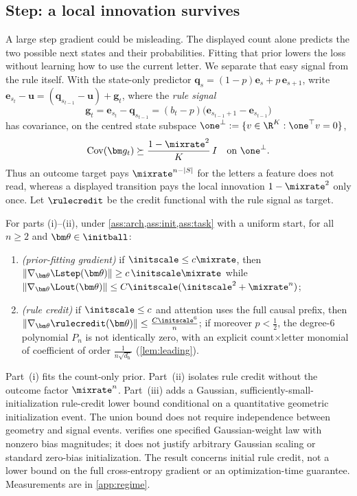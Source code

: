 \subsection{Step: a local innovation survives}
A large step gradient could be misleading. The displayed count alone predicts the two possible next states and their probabilities.
Fitting that prior lowers the loss without learning how to use the current letter. We separate that easy signal from the rule itself. With the
state-only predictor $\bm q_s=(1-p)\bm e_s+p\,\bm e_{s+1}$, write $\bm e_{s_t}-\bm u=(\bm q_{s_{t-1}}-\bm u)+\bm g_t$, where the
\emph{rule signal}
\[
 \bm g_t=\bm e_{s_t}-\bm q_{s_{t-1}}=(b_t-p)\bigl(\bm e_{s_{t-1}+1}-\bm e_{s_{t-1}}\bigr)
\]
has covariance, on the centred state subspace $\one^\perp:=\{v\in\R^K:\one^\top v=0\}$,
\begin{equation}
 \operatorname{Cov}(\bm g_t)\succeq\frac{1-\mixrate^2}{K}\,I
 \quad\text{on }\one^\perp.
 \label{eq:local-variation}
\end{equation}
Thus an outcome target pays $\mixrate^{n-|S|}$ for the letters a feature does not read, whereas a displayed transition pays the
local innovation $1-\mixrate^2$ only once. Let $\rulecredit$ be the credit
functional with the rule signal as target.

\begin{theorem}
\label{thm:separation}
For parts (i)--(ii), under \cref{ass:arch,ass:init,ass:task} with a uniform start,
for all $n\ge2$ and $\bm\theta\in\initball$:
\begin{enumerate}[label=(\roman*),leftmargin=*,itemsep=0pt,topsep=2pt]
\item \emph{(prior-fitting gradient)} if $\initscale\le c\mixrate$, then $\|\nabla_{\bm\theta}\Lstep(\bm\theta)\|\ge c\,\initscale\mixrate$ while
$\|\nabla_{\bm\theta}\Lout(\bm\theta)\|\le C\initscale(\initscale^2+\mixrate^n)$;
\item \emph{(rule credit)} if $\initscale\le c$ and attention uses the full causal prefix, then $\|\nabla_{\bm\theta}\rulecredit(\bm\theta)\|\le \frac{C\initscale^6}{n}$; if
moreover $p<\tfrac{1}{2}$, the degree-$6$ polynomial $P_n$ is not identically zero, with an explicit count$\times$letter monomial of
coefficient of order $\frac{1}{n\sqrt{d_{\mathrm h}}}$
(\cref{lem:leading}).

\end{enumerate}
\end{theorem}

Part~(i) fits the count-only prior. Part~(ii) isolates rule credit without the
outcome factor $\mixrate^n$. Part~(iii) adds a Gaussian, sufficiently-small-initialization
rule-credit lower bound conditional on a quantitative geometric initialization event.
The union bound does not require independence between geometry and signal events.
 verifies one specified Gaussian-weight law with
nonzero bias magnitudes; it does not justify arbitrary Gaussian scaling or standard
zero-bias initialization. The result concerns initial rule credit, not a lower bound
on the full cross-entropy gradient or an optimization-time guarantee.
Measurements are in \cref{app:regime}.

